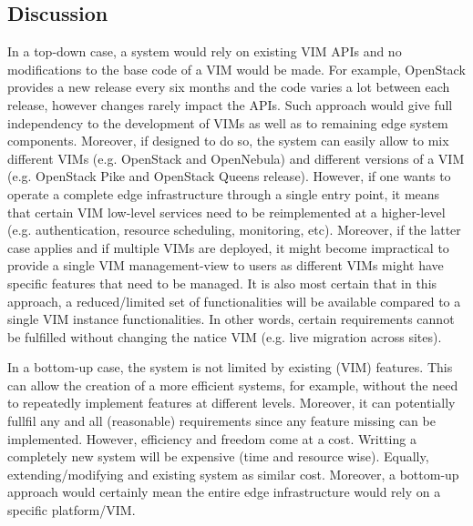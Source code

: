


\subsection{Discussion}
\label{sec:design_discussion}


In a top-down case, a system  would rely on existing VIM APIs and no modifications to the base code of a VIM would be made. For example, OpenStack provides a new release every six months and the code varies a lot between each release, however changes rarely impact the APIs. Such approach would give full independency to the development of VIMs as well as to remaining edge system components. Moreover, if designed to do so, the system can easily allow to mix different VIMs (e.g. OpenStack and OpenNebula) and different versions of a VIM (e.g. OpenStack Pike and OpenStack Queens release). 
However, if one wants to operate a complete edge infrastructure through a single entry point, it means that certain VIM low-level services need to be reimplemented at a higher-level (e.g. authentication, resource scheduling, monitoring, etc). Moreover, if the latter case applies and if multiple VIMs are deployed, it might become impractical to provide a single VIM management-view to users as different VIMs might have specific features that need to be managed. It is also most certain that in this approach, a reduced/limited set of functionalities will be available compared to a single VIM instance functionalities. In other words, certain requirements cannot be fulfilled without changing the natice VIM (e.g. live migration across sites).


In a bottom-up case, the system is not limited by existing (VIM) features. This can allow the creation of a more efficient systems, for example, without the need to repeatedly implement features at different levels. Moreover, it can potentially fullfil any and all (reasonable) requirements since any feature missing can be implemented. 
However, efficiency and freedom come at a cost. Writting a completely new system will be expensive (time and resource wise). Equally, extending/modifying and existing system as similar cost. Moreover, a bottom-up approach would certainly mean the entire edge infrastructure would rely on a specific platform/VIM. 


